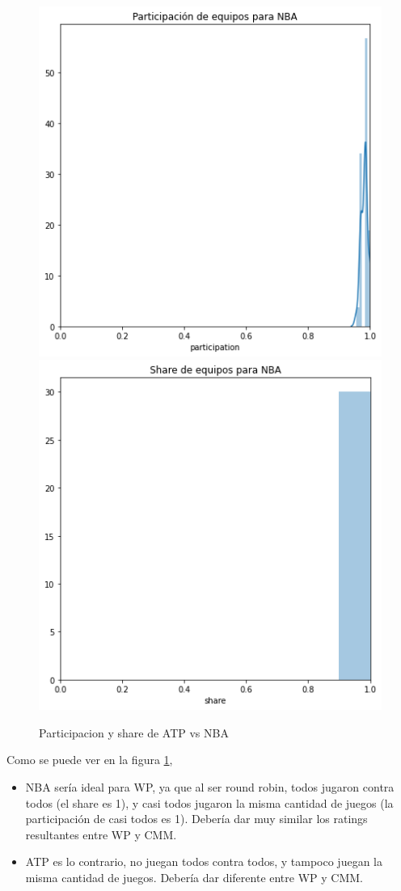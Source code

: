 \documentclass[a4paper]{article}
\begin{document}
\begin{figure}[H]
\begin{center}
        \includegraphics[scale=0.5]{img/reales/nba-part.png}
        \includegraphics[scale=0.5]{img/reales/nba-share.png}
        \caption{Participacion y share de ATP vs NBA}
        \label{real-part-share}
    \end{center}
\end{figure}

Como se puede ver en la figura \ref{real-part-share},
\begin{itemize}
    \item NBA sería ideal para WP, ya que al ser round robin, todos jugaron contra todos (el share es 1), y casi todos jugaron la misma cantidad de juegos (la participación de casi todos es 1). Debería dar muy similar los ratings resultantes entre WP y CMM.
    \item ATP es lo contrario, no juegan todos contra todos, y tampoco juegan la misma cantidad de juegos. Debería dar diferente entre WP y CMM.
\end{itemize}
\end{document}
